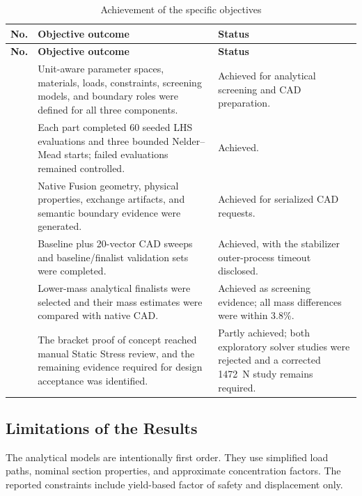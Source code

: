 \begin{longtable}{
    >{\raggedright\arraybackslash}p{}
    >{\raggedright\arraybackslash}p{}
    >{\raggedright\arraybackslash}p{}}
\caption{Achievement of the specific objectives}
\label{tab:objective-achievement}\\
\toprule
\textbf{No.} & \textbf{Objective outcome} & \textbf{Status}\\
\midrule
\endfirsthead
\toprule
\textbf{No.} & \textbf{Objective outcome} & \textbf{Status}\\
\midrule
\endhead
\bottomrule
\endfoot
1 & Unit-aware parameter spaces, materials, loads, constraints, screening
models, and boundary roles were defined for all three components. &
Achieved for analytical screening and CAD preparation.\\
2 & Each part completed 60 seeded LHS evaluations and three bounded
Nelder--Mead starts; failed evaluations remained controlled. &
Achieved.\\
3 & Native Fusion geometry, physical properties, exchange artifacts, and
semantic boundary evidence were generated. &
Achieved for serialized CAD requests.\\
4 & Baseline plus 20-vector CAD sweeps and baseline/finalist validation sets
were completed. &
Achieved, with the stabilizer outer-process timeout disclosed.\\
5 & Lower-mass analytical finalists were selected and their mass estimates
were compared with native CAD. &
Achieved as screening evidence; all mass differences were within 3.8\%.\\
6 & The bracket proof of concept reached manual Static Stress review, and the
remaining evidence required for design acceptance was identified. &
Partly achieved; both exploratory solver studies were rejected and a corrected
1472~N study remains required.\\
\end{longtable}

\subsection{Limitations of the Results}
\label{sec:results-limitations}

The analytical models are intentionally first order. They use simplified load
paths, nominal section properties, and approximate concentration factors. The
reported constraints include yield-based factor of safety and displacement
only.

